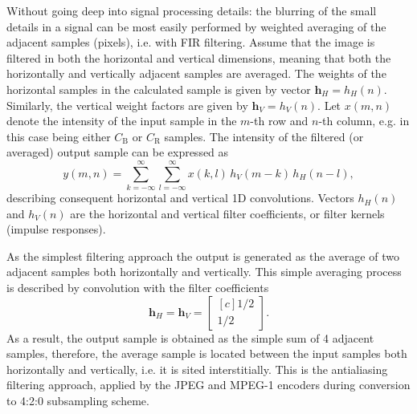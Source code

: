 \vspace{3mm}
Without going deep into signal processing details: the blurring of the small details in a signal can be most easily performed by weighted averaging of the adjacent samples (pixels), i.e. with FIR filtering.
Assume that the image is filtered in both the horizontal and vertical dimensions, meaning that both the horizontally and vertically adjacent samples are averaged.
The weights of the horizontal samples in the calculated sample is given by vector $\mathbf{h}_H = h_H(n)$.
Similarly, the vertical weight factors are given by $\mathbf{h}_V = h_V(n)$.
Let $x(m,n)$ denote the intensity of the input sample in the $m$-th row and $n$-th column, e.g. in this case being either $C_{\mathrm{B}}$ or  $C_{\mathrm{R}}$ samples.
The intensity of the filtered (or averaged) output sample can be expressed as
\begin{equation}
y(m,n) = \sum_{k = -\infty}^{\infty} \sum_{l = -\infty}^{\infty} x(k,l)\, h_V(m-k) \, h_H(n-l),
\end{equation}
describing consequent horizontal and vertical 1D convolutions.
Vectors $h_H(n)$ and $h_V(n)$ are the horizontal and vertical filter coefficients, or filter kernels (impulse responses).

As the simplest filtering approach the output is generated as the average of two adjacent samples both horizontally and vertically.
This simple averaging process is described by convolution with the filter coefficients
\begin{equation}
\mathbf{h}_H =
\mathbf{h}_V =
\begin{bmatrix}[c]
       1/2 \\[0.3em]
       1/2\end{bmatrix}.
\end{equation}
As a result, the output sample is obtained as the simple sum of 4 adjacent samples, therefore, the average sample is located between the input samples both horizontally and vertically, i.e. it is sited interstitially.
This is the antialiasing filtering approach, applied by the JPEG and MPEG-1 encoders during conversion to 4:2:0 subsampling scheme.

